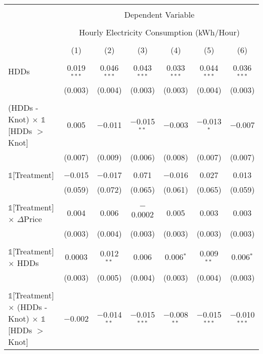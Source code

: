 
\begin{table}[!htbp] \centering 
  \label{Table:Breakdown-of-Average-Treatement-Effects_As-a-Function-of-Rate-Changes_For-Different-Intervals} 
\scriptsize
\begin{longtable}{@{\extracolsep{15pt}}lcccccc} 
\\[-1.8ex]\hline 
\hline \\[-1.8ex] 
 & \multicolumn{6}{c}{Dependent Variable} \\ 
\cline{2-7} 
\\[-1.8ex] & \multicolumn{6}{c}{Hourly Electricity Consumption  (kWh/Hour)} \\ 
\\[-1.8ex] & (1) & (2) & (3) & (4) & (5) & (6)\\ 
\hline \\[-1.8ex] \endhead
 HDDs & 0.019$^{***}$ & 0.046$^{***}$ & 0.043$^{***}$ & 0.033$^{***}$ & 0.044$^{***}$ & 0.036$^{***}$ \\ 
  & (0.003) & (0.004) & (0.003) & (0.003) & (0.004) & (0.003) \\ 
  & & & & & & \\ 
 (HDDs - Knot) $\times$ $\mathbb{1}$[HDDs $>$ Knot] & 0.005 & $-$0.011 & $-$0.015$^{**}$ & $-$0.003 & $-$0.013$^{*}$ & $-$0.007 \\ 
  & (0.007) & (0.009) & (0.006) & (0.008) & (0.007) & (0.007) \\ 
  & & & & & & \\ 
 $\mathbb{1}$[Treatment] & $-$0.015 & $-$0.017 & 0.071 & $-$0.016 & 0.027 & 0.013 \\ 
  & (0.059) & (0.072) & (0.065) & (0.061) & (0.065) & (0.059) \\ 
  & & & & & & \\ 
 $\mathbb{1}$[Treatment] $\times$ $\Delta$Price & 0.004 & 0.006 & $-$0.0002 & 0.005 & 0.003 & 0.003 \\ 
  & (0.003) & (0.004) & (0.003) & (0.003) & (0.003) & (0.003) \\ 
  & & & & & & \\ 
 $\mathbb{1}$[Treatment] $\times$ HDDs & 0.0003 & 0.012$^{**}$ & 0.006 & 0.006$^{*}$ & 0.009$^{**}$ & 0.006$^{*}$ \\ 
  & (0.003) & (0.005) & (0.004) & (0.003) & (0.004) & (0.003) \\ 
  & & & & & & \\ 
 $\mathbb{1}$[Treatment] $\times$ (HDDs - Knot) $\times$ $\mathbb{1}$[HDDs $>$ Knot] & $-$0.002 & $-$0.014$^{**}$ & $-$0.015$^{***}$ & $-$0.008$^{**}$ & $-$0.015$^{***}$ & $-$0.010$^{***}$ \\ 

\end{longtable}
\end{table}
